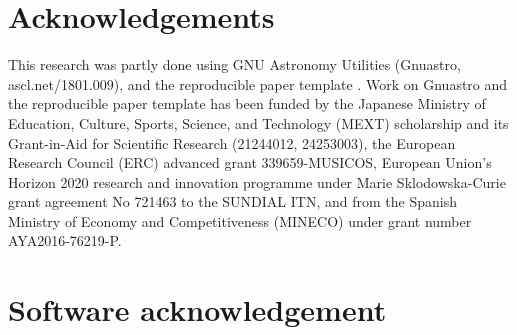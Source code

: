 \documentclass[10pt, twocolumn]{article}
\begin{document}
\section{Acknowledgements}

This research was partly done using GNU Astronomy Utilities (Gnuastro,
ascl.net/1801.009), and the reproducible paper template
\projectversion. Work on Gnuastro and the reproducible paper template has
been funded by the Japanese Ministry of Education, Culture, Sports,
Science, and Technology (MEXT) scholarship and its Grant-in-Aid for
Scientific Research (21244012, 24253003), the European Research Council
(ERC) advanced grant 339659-MUSICOS, European Union’s Horizon 2020 research
and innovation programme under Marie Sklodowska-Curie grant agreement No
721463 to the SUNDIAL ITN, and from the Spanish Ministry of Economy and
Competitiveness (MINECO) under grant number AYA2016-76219-P.

\printbibliography

\appendix

\section{Software acknowledgement}


\end{document}
